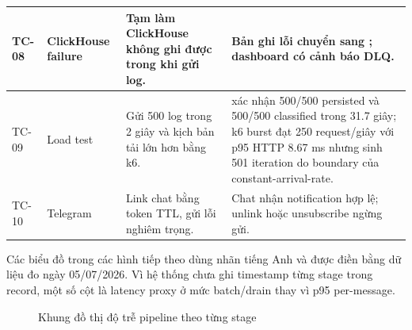 \begin{longtable}{|P{1.2cm}|P{3.2cm}|P{4.7cm}|P{5.2cm}|}
TC-08 & ClickHouse failure & Tạm làm ClickHouse không ghi được trong khi gửi log. & Bản ghi lỗi chuyển sang ; dashboard có cảnh báo DLQ. \\ \hline
TC-09 & Load test & Gửi 500 log trong 2 giây và kịch bản tải lớn hơn bằng k6. &  xác nhận 500/500 persisted và 500/500 classified trong 31.7 giây; k6 burst đạt 250 request/giây với p95 HTTP 8.67 ms nhưng sinh 501 iteration do boundary của constant-arrival-rate. \\ \hline
TC-10 & Telegram & Link chat bằng token TTL, gửi lỗi nghiêm trọng. & Chat nhận notification hợp lệ; unlink hoặc unsubscribe ngừng gửi. \\ \hline
\end{longtable}

Các biểu đồ trong các hình tiếp theo dùng nhãn tiếng Anh và được điền bằng dữ liệu đo ngày 05/07/2026. Vì hệ thống chưa ghi timestamp từng stage trong record, một số cột là latency proxy ở mức batch/drain thay vì p95 per-message.


\begin{figure}[H]
\centering
{}
\caption{Khung đồ thị độ trễ pipeline theo từng stage}
\label{fig:graph-latency}
\end{figure}



